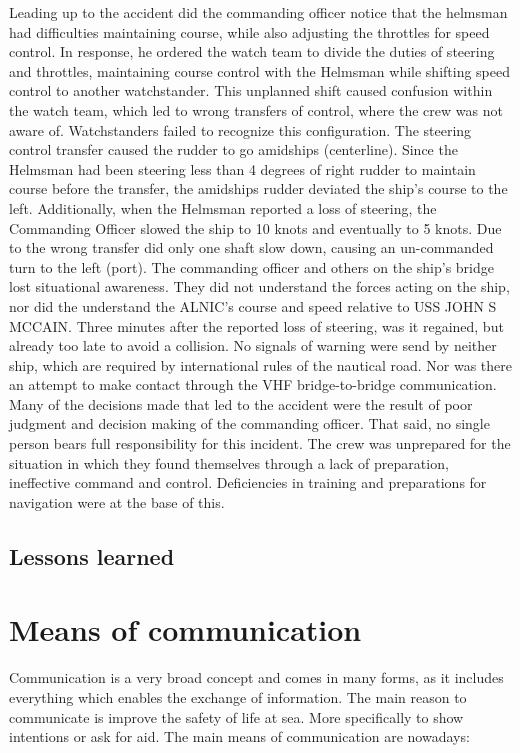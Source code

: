 Leading up to the accident did the commanding officer notice that the helmsman had difficulties maintaining course, while also adjusting the throttles for speed control. In response, he ordered the watch team to divide the duties of steering and throttles, maintaining course control with the Helmsman while shifting speed control to another watchstander. This unplanned shift caused confusion within the watch team, which led to wrong transfers of control, where the crew was not aware of. 
Watchstanders failed to recognize this configuration. The steering control transfer caused the rudder to go amidships (centerline). Since the Helmsman had been steering less than 4 degrees of right rudder to maintain course before the transfer, the amidships rudder deviated the ship’s course to the left. Additionally, when the Helmsman reported a loss of steering, the Commanding Officer slowed the ship to 10 knots and eventually to 5 knots. Due to the wrong transfer did only one shaft slow down, causing an un-commanded turn to the left (port). The commanding officer and others on the ship's bridge lost situational awareness. They did not understand the forces acting on the ship, nor did the understand the ALNIC's course and speed relative to USS JOHN S MCCAIN. Three minutes after the reported loss of steering, was it regained, but already too late to avoid a collision. No signals of warning were send by neither ship, which are required by international rules of the nautical road. Nor was there an attempt to make contact through the \ac{VHF} bridge-to-bridge communication.
Many of the decisions made that led to the accident were the result of poor judgment and decision making of the commanding officer. That said, no single person bears full responsibility for this incident. The crew was unprepared for the situation in which they found themselves through a lack of preparation, ineffective command and control. Deficiencies in training and preparations for navigation were at the base of this. \cite{USNavy2017}

\subsection{Lessons learned}


\section{Means of communication}
Communication is a very broad concept and comes in many forms, as it includes everything which enables the exchange of information. The main reason to communicate is improve the safety of life at sea. More specifically to show intentions or ask for aid. The main means of communication are nowadays:

